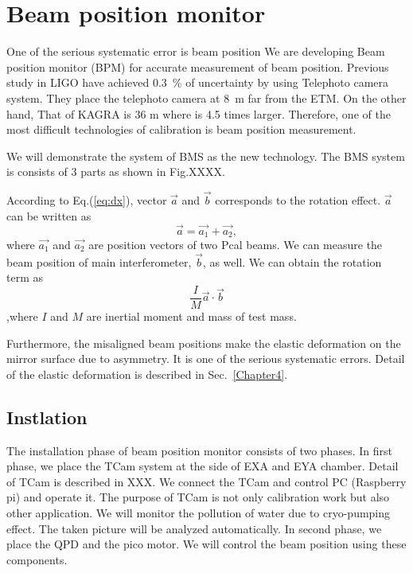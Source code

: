 
\chapter{Beam position monitor} %

\label{Chapter6} %
One of the serious systematic error is beam position
We are developing Beam position monitor (BPM) for accurate measurement of beam position.
Previous study in LIGO have achieved 0.3~\% of uncertainty by using Telephoto camera system.
They place the telephoto camera at 8~m far from the ETM. On the other hand, That of KAGRA is 36 m where is 4.5 times larger. Therefore, one of the most difficult technologies of calibration is beam position measurement.

We will demonstrate the system of BMS as  the new technology. The BMS system is consists of 3 parts as shown in Fig.XXXX.

According to Eq.(\ref{eq:dx}), vector $\vec{a}$ and $\vec{b}$ corresponds to the rotation effect. $\vec{a}$ can be written as
\begin{equation}
\vec{a}=\vec{a_1} + \vec{a_2},
\end{equation}
where $\vec{a_1}$ and $\vec{a_2}$ are position vectors of two Pcal beams. We can measure the beam position of main interferometer, $\vec{b}$, as well.
We can obtain the rotation term as
\begin{equation}
\frac{I}{M}\vec{a} \cdot \vec{b}
\end{equation}
,where $I$ and $M$ are inertial moment and mass of test mass.

Furthermore, the misaligned beam positions make the elastic deformation on the mirror surface due to asymmetry. It is one of the serious systematic errors.
Detail of the elastic deformation is described in Sec.~\ref{Chapter4}.

\section{Instlation}
The installation phase of beam position monitor consists of two phases.
In first phase, we place the TCam system at the side of EXA and EYA chamber.
Detail of TCam is described in XXX. We connect the TCam and control PC (Raspberry pi) and operate it.
The purpose of TCam is not only calibration work but also other application.
We will monitor the pollution of water due to cryo-pumping effect. The taken picture will be analyzed automatically.
In second phase, we place the QPD and the pico motor. We will control the beam position using these components.
